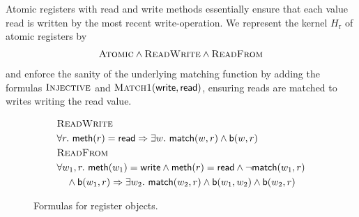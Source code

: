 \begin{example}

  Atomic registers with read and write methods essentially ensure
  that each value read is written by the most recent {\sc write}-operation.
  We represent the kernel $H_\mathrm{r}$ of atomic registers by
  \begin{align*}
    \textsc{Atomic} \land \textsc{ReadWrite} \land \textsc{ReadFrom}
  \end{align*}
  and enforce the sanity of the underlying matching function by adding the
  formulas $\textsc{Injective}$ and $\textsc{Match1}({\sf write},{\sf read})$,
  ensuring reads are matched to writes writing the read value.

\end{example}

\begin{figure}

  \footnotesize
  \begin{align*}
    & \textsc{ReadWrite} \\
    & \forall r.\ {\sf meth}(r) = {\sf read} \implies \exists w.\ {\sf match}(w,r) \land {\sf b}(w,r)
    \\
    & \textsc{ReadFrom} \\
    & \forall w_1, r.\ {\sf meth}(w_1) = {\sf write} \land {\sf meth}(r) = {\sf read} \land \neg {\sf match}(w_1,r) \\
    & \quad \land {\sf b}(w_1,r) \implies \exists w_2.\ {\sf match}(w_2,r) \land {\sf b}(w_1,w_2) \land {\sf b}(w_2,r)
  \end{align*}

  \caption{Formulas for register objects.}
  \label{fig:formulas:register}

\end{figure}

